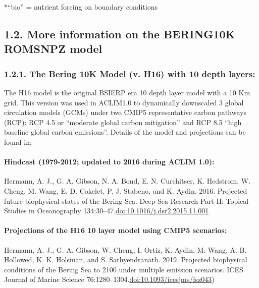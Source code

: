 \documentclass[
]{article}
\begin{document}
*``bio'' = nutrient forcing on boundary conditions

\hypertarget{more-information-on-the-bering10k-romsnpz-model}{%
\subsection{1.2. More information on the BERING10K ROMSNPZ
model}\label{more-information-on-the-bering10k-romsnpz-model}}

\hypertarget{the-bering-10k-model-v.-h16-with-10-depth-layers}{%
\subsubsection{1.2.1. The Bering 10K Model (v. H16) with 10 depth
layers:}\label{the-bering-10k-model-v.-h16-with-10-depth-layers}}

The H16 model is the original BSIERP era 10 depth layer model with a 10
Km grid. This version was used in ACLIM1.0 to dynamically downscaled 3
global circulation models (GCMs) under two CMIP5 representative carbon
pathways (RCP): RCP 4.5 or ``moderate global carbon mitigation'' and RCP
8.5 ``high baseline global carbon emissions''. Details of the model and
projections can be found in:

\hypertarget{hindcast-1979-2012-updated-to-2016-during-aclim-1.0}{%
\paragraph{Hindcast (1979-2012; updated to 2016 during ACLIM
1.0):}\label{hindcast-1979-2012-updated-to-2016-during-aclim-1.0}}

Hermann, A. J., G. A. Gibson, N. A. Bond, E. N. Curchitser, K. Hedstrom,
W. Cheng, M. Wang, E. D. Cokelet, P. J. Stabeno, and K. Aydin. 2016.
Projected future biophysical states of the Bering Sea. Deep Sea Research
Part II: Topical Studies in Oceanography
134:30--47.\href{http://dx.doi.org/10.1016/j.dsr2.2015.11.001}{doi:10.1016/j.dsr2.2015.11.001}

\hypertarget{projections-of-the-h16-10-layer-model-using-cmip5-scenarios}{%
\paragraph{Projections of the H16 10 layer model using CMIP5
scenarios:}\label{projections-of-the-h16-10-layer-model-using-cmip5-scenarios}}

Hermann, A. J., G. A. Gibson, W. Cheng, I. Ortiz, K. Aydin, M. Wang, A.
B. Hollowed, K. K. Holsman, and S. Sathyendranath. 2019. Projected
biophysical conditions of the Bering Sea to 2100 under multiple emission
scenarios. ICES Journal of Marine Science
76:1280--1304.\href{https://academic.oup.com/icesjms/article/76/5/1280/5477847?login=true}{doi:10.1093/icesjms/fsz043})
\end{document}
